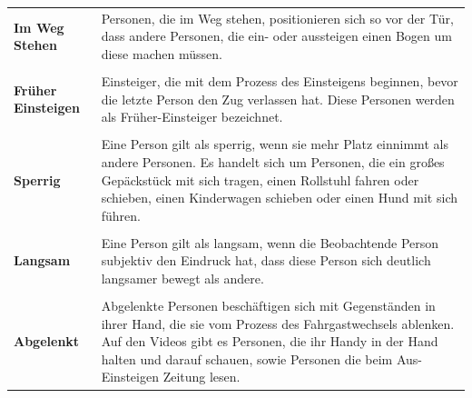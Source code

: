 \begin{longtable}{l p{10.5 cm}}
	\centering
			 \textbf{Im Weg Stehen} & Personen, die im Weg stehen, positionieren sich so vor der Tür, dass andere Personen, die ein- oder aussteigen einen Bogen um diese machen müssen.\\
			 & \\
			 \textbf{Früher Einsteigen}	& Einsteiger, die mit dem Prozess des Einsteigens beginnen, bevor die letzte Person den Zug verlassen hat. Diese Personen werden als Früher-Einsteiger bezeichnet.\\
			 & \\
			 \textbf{Sperrig} & Eine Person gilt als sperrig, wenn sie mehr Platz einnimmt als andere Personen. Es handelt sich um Personen, die ein großes  Gepäckstück mit sich tragen, einen Rollstuhl fahren oder schieben, einen Kinderwagen schieben oder einen Hund mit sich führen. \\
			 &\\
			 \textbf{Langsam} & Eine Person gilt als langsam, wenn die Beobachtende Person subjektiv den Eindruck hat, dass diese Person sich deutlich langsamer bewegt als andere.\\
			 &\\	
			 \textbf{Abgelenkt} & Abgelenkte Personen beschäftigen sich mit Gegenständen in ihrer Hand, die sie vom Prozess des Fahrgastwechsels ablenken. Auf den Videos gibt es Personen, die ihr Handy in der Hand halten und darauf schauen, sowie Personen die beim Aus- \bzw Einsteigen Zeitung lesen.\\
\end{longtable} 

